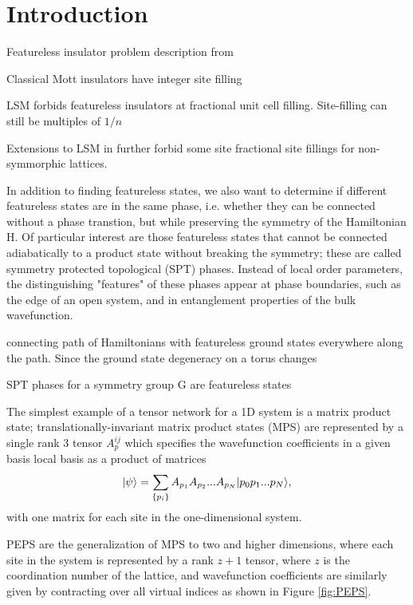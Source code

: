 
\section{Introduction}


Featureless insulator problem description from   
\bi 
\item Classical Mott insulators have integer site filling
\item LSM forbids featureless insulators at fractional unit cell 
filling. Site-filling can still be multiples of $1/n$
\item Extensions to LSM in  further 
forbid some site fractional site fillings for non-symmorphic lattices.
\ei 

In addition to finding featureless states, we also want to determine
 if different featureless states are in the same phase, i.e. whether 
 they can be connected without a phase transtion, but while preserving 
 the symmetry of the Hamiltonian H. Of particular interest are those 
 featureless states that cannot be connected adiabatically to a 
 product state without breaking the symmetry; these are called 
 symmetry protected topological (SPT) phases. Instead of local order 
 parameters, the distinguishing "features" of these phases appear at 
 phase boundaries, such as the edge of an open system, and in 
 entanglement properties of the bulk wavefunction.



 connecting path of Hamiltonians with featureless ground states everywhere along the path. Since the ground state degeneracy on a torus changes

SPT phases for a symmetry group G are featureless states 

The simplest example of a tensor network for a 1D system is a matrix 
product state; translationally-invariant matrix product states (MPS) 
are represented by a single rank 3 tensor $A_p^{ij}$ which specifies 
the wavefunction coefficients in a given basis local basis as a 
product of matrices $$\vert \psi \rangle = \sum\limits_{\{p_i\}} A_{p_1} 
A_{p_2} ... A_{p_N} \vert p_0 p_1 ... p_N \rangle,$$ with one matrix for each 
site in the one-dimensional system.

PEPS are the generalization of MPS to two and higher dimensions, where 
each site in the system is represented by a rank $z+1$ tensor, where 
$z$ is the coordination number of the lattice, and wavefunction 
coefficients are similarly given by contracting over all virtual 
indices as shown in Figure \ref{fig:PEPS}.\cite{verstraete2004}